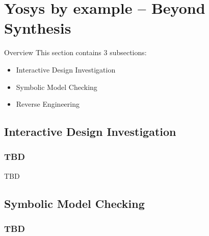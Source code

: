 
\section{Yosys by example -- Beyond Synthesis}

\begin{frame}
\sectionpage
\end{frame}

\begin{frame}{Overview}
This section contains 3 subsections:
\begin{itemize}
\item Interactive Design Investigation
\item Symbolic Model Checking
\item Reverse Engineering
\end{itemize}
\end{frame}


\subsection{Interactive Design Investigation}

\begin{frame}
\subsectionpage
\subsectionpagesuffix
\end{frame}

\subsubsection{TBD}

\begin{frame}{\subsubsecname}
TBD
\end{frame}


\subsection{Symbolic Model Checking}

\begin{frame}
\subsectionpage
\subsectionpagesuffix
\end{frame}

\subsubsection{TBD}

